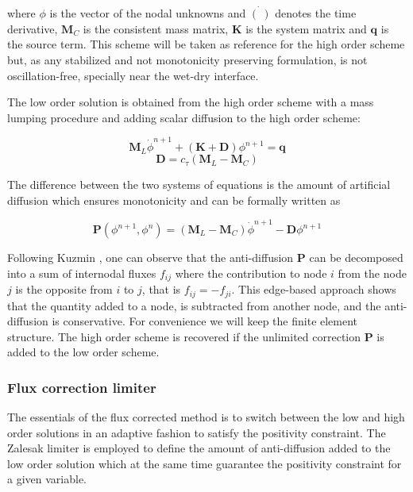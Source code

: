 where $\phi$ is the vector of the nodal unknowns and $\dot{(\ )}$ denotes the time derivative, $\mathbf{M}_C$ is the consistent mass matrix, $\mathbf{K}$ is the system matrix and $\mathbf{q}$ is the source term. This scheme will be taken as reference for the high order scheme but, as any stabilized and not monotonicity preserving formulation, is not oscillation-free, specially near the wet-dry interface.

The low order solution is obtained from the high order scheme with a mass lumping procedure and adding scalar diffusion to the high order scheme:

\begin{equation} \label{lo}
\mathbf{M}_L\dot{\phi}^{n+1} + \left(\mathbf{K+D}\right)\phi^{n+1} = \mathbf{q}
\end{equation}
\begin{equation} \label{scalar_diffusion}
\mathbf{D} = c_\tau\left(\mathbf{M}_L - \mathbf{M}_C\right)
\end{equation}

The difference between the two systems of equations is the amount of artificial diffusion which ensures monotonicity and can be formally written as

\begin{equation}
\mathbf{P}(\phi^{n+1}, \phi^n) = (\mathbf{M}_L - \mathbf{M}_C)\dot{\phi}^{n+1} - \mathbf{D} \phi^{n+1}
\end{equation}

Following Kuzmin \cite{kuzmin2005a}, one can observe that the anti-diffusion $\mathbf{P}$ can be decomposed into a sum of internodal fluxes $f_{ij}$ where the contribution to node $i$ from the node $j$ is the opposite from $i$ to $j$, that is $f_{ij}=-f_{ji}$. This edge-based approach shows that the quantity added to a node, is subtracted from another node, and the anti-diffusion is conservative. For convenience we will keep the finite element structure. The high order scheme is recovered if the unlimited correction $\mathbf{P}$ is added to the low order scheme.



\subsubsection{Flux correction limiter}

The essentials of the flux corrected method is to switch between the low and high order solutions in an adaptive fashion to satisfy the positivity constraint. The Zalesak limiter is employed to define the amount of anti-diffusion added to the low order solution which at the same time guarantee the positivity constraint for a given variable.


